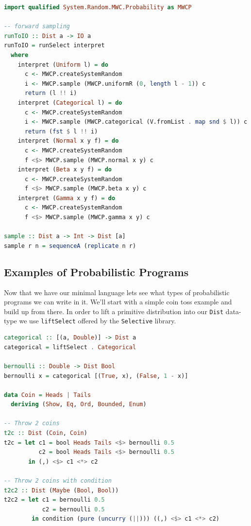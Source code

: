 \documentclass[
  oneside,
  11pt, a4paper,
  footinclude=true,
  headinclude=true,
  cleardoublepage=empty
]{scrbook}
\theoremstyle{definition}
\theoremstyle{definition}
\begin{document}
    \begin{lstlisting}[language=Haskell, caption={Sampling function},captionpos=b]
import qualified System.Random.MWC.Probability as MWCP
 
-- forward sampling
runToIO :: Dist a -> IO a
runToIO = runSelect interpret
  where
    interpret (Uniform l) = do
      c <- MWCP.createSystemRandom
      i <- MWCP.sample (MWCP.uniformR (0, length l - 1)) c
      return (l !! i)
    interpret (Categorical l) = do
      c <- MWCP.createSystemRandom
      i <- MWCP.sample (MWCP.categorical (V.fromList . map snd $ l)) c
      return (fst $ l !! i)
    interpret (Normal x y f) = do
      c <- MWCP.createSystemRandom
      f <$> MWCP.sample (MWCP.normal x y) c
    interpret (Beta x y f) = do
      c <- MWCP.createSystemRandom
      f <$> MWCP.sample (MWCP.beta x y) c
    interpret (Gamma x y f) = do
      c <- MWCP.createSystemRandom
      f <$> MWCP.sample (MWCP.gamma x y) c

sample :: Dist a -> Int -> Dist [a]
sample r n = sequenceA (replicate n r)
    \end{lstlisting}
    
    \subsection{Examples of Probabilistic Programs}
    
    Now that we have our minimal language lets see what types of probabilistic programs we can write in it. We'll start with a simple coin toss example and build up from there. In order to lift a primitive distribution into our \texttt{Dist} data-type we use \texttt{liftSelect} offered by the \texttt{Selective} library.
    
    \begin{lstlisting}[language=Haskell, caption={Coin toss},captionpos=b]
categorical :: [(a, Double)] -> Dist a
categorical = liftSelect . Categorical

bernoulli :: Double -> Dist Bool
bernoulli x = categorical [(True, x), (False, 1 - x)]

data Coin = Heads | Tails
  deriving (Show, Eq, Ord, Bounded, Enum)
  
-- Throw 2 coins
t2c :: Dist (Coin, Coin)
t2c = let c1 = bool Heads Tails <$> bernoulli 0.5
          c2 = bool Heads Tails <$> bernoulli 0.5
       in (,) <$> c1 <*> c2

-- Throw 2 coins with condition
t2c2 :: Dist (Maybe (Bool, Bool))
t2c2 = let c1 = bernoulli 0.5
           c2 = bernoulli 0.5
        in condition (pure (uncurry (||))) ((,) <$> c1 <*> c2)
    \end{lstlisting}
    
\end{document}
